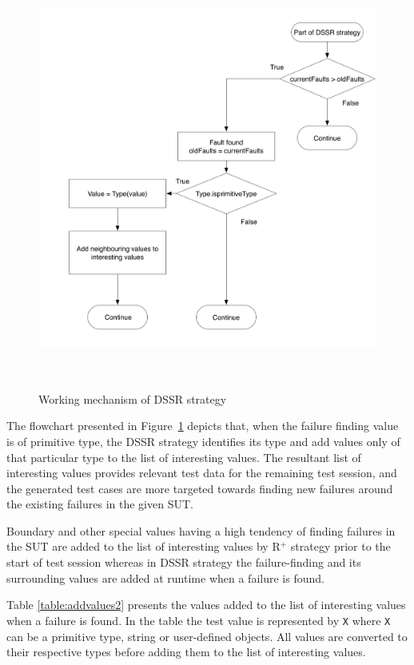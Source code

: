 \bigskip
\begin{figure}[H]
\centering
\includegraphics[width=12cm, height=14cm]{chapter4/flowchart1.png}
\bigskip
\caption{Working mechanism of DSSR strategy}
\label{fig:Working_DSSS}
\end{figure}
\bigskip

The flowchart presented in Figure~\ref{fig:Working_DSSS} depicts that, when the failure finding value is of primitive type, the DSSR strategy identifies its type and add values only of that particular type to the list of interesting values. The resultant list of interesting values provides relevant test data for the remaining test session, and the generated test cases are more targeted towards finding new failures around the existing failures in the given SUT.

Boundary and other special values having a high tendency of finding failures in the SUT are added to the list of interesting values by R$^+$ strategy prior to the start of test session whereas in DSSR strategy the failure-finding and its surrounding values are added at runtime when a failure is found. 

Table \ref{table:addvalues2} presents the values added to the list of interesting values when a failure is found. In the table the test value is represented by \verb+X+ where \verb+X+ can be a primitive type, string or user-defined objects. All values are converted to their respective types before adding them to the list of interesting values.



